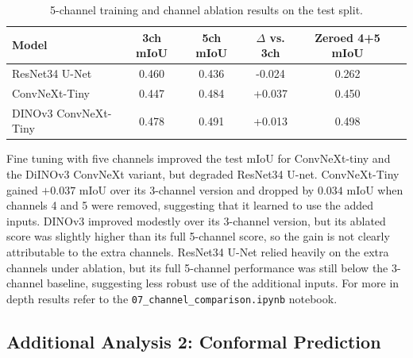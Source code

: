 \documentclass{article}
\begin{document}
\begin{table}[h]
  \caption{5-channel training and channel ablation results on the test split.}
  \label{tab:channel_ablation}
  \centering
  \begin{tabular}{lccccc}
    \toprule
    Model & 3ch mIoU & 5ch mIoU & $\Delta$ vs. 3ch & Zeroed 4+5 mIoU \\    
    \midrule
    ResNet34 U-Net & 0.460 & 0.436 & -0.024 & 0.262 \\
    ConvNeXt-Tiny & 0.447 & 0.484 & +0.037 & 0.450 \\
    DINOv3 ConvNeXt-Tiny & 0.478 & 0.491 & +0.013 & 0.498 \\
    \bottomrule
  \end{tabular}
\end{table}

Fine tuning with five channels improved the test mIoU for ConvNeXt-tiny and the DiINOv3 ConvNeXt variant, but degraded ResNet34 U-net. ConvNeXt-Tiny gained $+0.037$ mIoU over its 3-channel version and dropped by $0.034$ mIoU when channels 4 and 5 were removed, suggesting that it learned to use the added inputs. DINOv3 improved modestly over its 3-channel version, but its ablated score was slightly higher than its full 5-channel score, so the gain is not clearly attributable to the extra channels. ResNet34 U-Net relied heavily on the extra channels under ablation, but its full 5-channel performance was still below the 3-channel baseline, suggesting less robust use of the additional inputs. For more in depth results refer to the \verb|07_channel_comparison.ipynb| notebook.

\subsection{Additional Analysis 2: Conformal Prediction}
\end{document}
